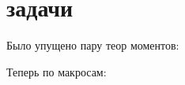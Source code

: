 \documentclass[a4paper,10pt]{article}
\begin{document}
\section*{задачи}
Было упущено пару теор моментов:
\begin{enumerate}
\end{enumerate}
Теперь по макросам:
\end{document}
